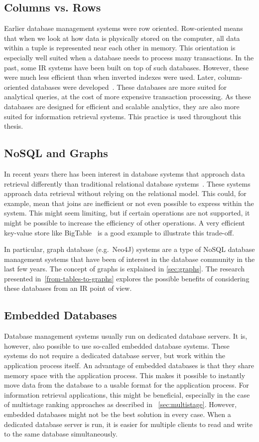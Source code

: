 \subsection{Columns vs. Rows}
Earlier database management systems were row oriented. Row-oriented means that when we look at how data is physically stored on the computer, all data within a tuple is represented near each other in memory. This orientation is especially well suited when a database needs to process many transactions. In the past, some IR systems have been built on top of such databases. However, these were much less efficient than when inverted indexes were used. Later, column-oriented databases were developed~\cite{column-oriented,monet}. These databases are more suited for analytical queries, at the cost of more expensive transaction processing. As these databases are designed for efficient and scalable analytics, they are also more suited for information retrieval systems. This practice is used throughout this thesis. 

\subsection{NoSQL and Graphs}
\label{sec:nosqlgraph}
In recent years there has been interest in database systems that approach data retrieval differently than traditional relational database systems~\citep{nosql}. These systems approach data retrieval without relying on the relational model. This could, for example, mean that joins are inefficient or not even possible to express within the system. This might seem limiting, but if certain operations are not supported, it might be possible to increase the efficiency of other operations. A very efficient key-value store like BigTable~\citep{bigtable} is a good example to illustrate this trade-off.

In particular, graph database (e.g.\ Neo4J\citep{neo4j}) systems are a type of NoSQL database management systems that have been of interest in the database community in the last few years. The concept of graphs is explained in \cref{sec:graphs}. The research presented in~\cref{from-tables-to-graphs} explores the possible benefits of considering these databases from an IR point of view.

\subsection{Embedded Databases}
Database management systems usually run on dedicated database servers. It is, however, also possible to use so-called embedded database systems. These systems do not require a dedicated database server, but work within the application process itself. An advantage of embedded databases is that they share memory space with the application process. This makes it possible to instantly move data from the database to a usable format for the application process. For information retrieval applications, this might be beneficial, especially in the case of multistage ranking approaches as described in ~\cref{sec:multistage}. However, embedded databases might not be the best solution in every case. When a dedicated database server is run, it is easier for multiple clients to read and write to the same database simultaneously. 

